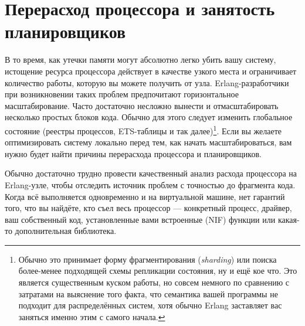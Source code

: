 \chapter{Перерасход процессора и занятость планировщиков}
\label{chap:cpu-hogs}

В то время, как утечки памяти могут абсолютно легко убить вашу систему, истощение ресурса процессора действует в качестве узкого места и ограничивает количество работы, которую вы можете получить от узла. Erlang-разработчики при возникновении таких проблем предпочитают горизонтальное масштабирование. Часто достаточно несложно вынести и отмасштабировать несколько простых блоков кода. Обычно для этого следует изменить глобальное состояние (реестры процессов, ETS-таблицы и так далее)\footnote{Обычно это принимает форму фрагментирования (\emph{sharding}) или поиска более-менее подходящей схемы репликации состояния, ну и ещё кое что. Это является существенным куском работы, но совсем немного по сравнению с затратами на выяснение того факта, что семантика вашей программы не подходит для распределённых систем, хотя обычно Erlang заставляет вас заняться именно этим с самого начала.}. Если вы желаете оптимизировать систему локально перед тем, как начать масштабироваться, вам нужно будет найти причины перерасхода процессора и планировщиков.

Обычно достаточно трудно провести качественный анализ расхода процессора на Erlang-узле, чтобы отследить источник проблем с точностью до фрагмента кода. Когда всё выполняется одновременно и на виртуальной машине, нет гарантий того, что вы найдёте, кто съел весь процессор --- конкретный процесс, драйвер, ваш собственный код, установленные вами встроенные (NIF) функции или какая-то дополнительная библиотека.

